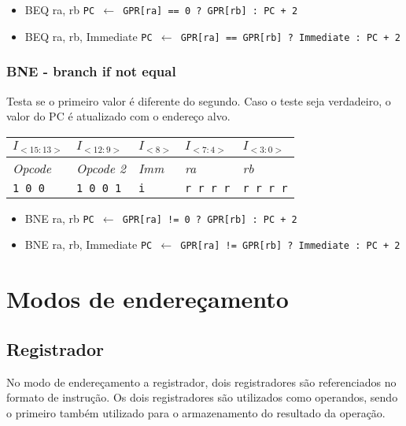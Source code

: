 \documentclass[11pt,a4paper]{report}
\begin{document}
\begin{itemize}
\item BEQ ra, rb
\subitem \texttt{PC $\leftarrow$ GPR[ra] == 0 ? GPR[rb] : PC + 2}
\item BEQ ra, rb, Immediate
\subitem \texttt{PC $\leftarrow$ GPR[ra] == GPR[rb] ? Immediate :  PC + 2}
\end{itemize}

\subsubsection{BNE - branch if not equal}
Testa se o primeiro valor é diferente do segundo. Caso o teste
seja verdadeiro, o valor do PC é atualizado com o endereço alvo.

\begin{table}[htb!]
\centering
\begin{tabular}{|p{2cm}|p{2cm}|p{2cm}|p{2cm}|p{2cm}|}
\hline
$I_{<15:13>}$ & $I_{<12:9>}$ & $I_{<8>}$ & $I_{<7:4>}$ & $I_{<3:0>}$  \\ \hline
\textit{Opcode} & \textit{Opcode 2} & \textit{Imm} & \textit{ra} & \textit{rb} \\ \hline
\texttt{1 0 0} & \texttt{1 0 0 1} & \texttt{i} & \texttt{r r r r} & \texttt{r r r r} \\ \hline
\end{tabular}
\end{table}

\begin{itemize}
\item BNE ra, rb
\subitem \texttt{PC $\leftarrow$ GPR[ra] != 0 ? GPR[rb] : PC + 2}
\item BNE ra, rb, Immediate
\subitem \texttt{PC $\leftarrow$ GPR[ra] != GPR[rb] ? Immediate :  PC + 2}
\end{itemize}


\section{Modos de endereçamento}

\subsection{Registrador}

No modo de endereçamento a registrador, dois registradores são referenciados
no formato de instrução. Os dois registradores são utilizados como
operandos, sendo o primeiro também utilizado para o armazenamento do
resultado da operação.
\end{document}
